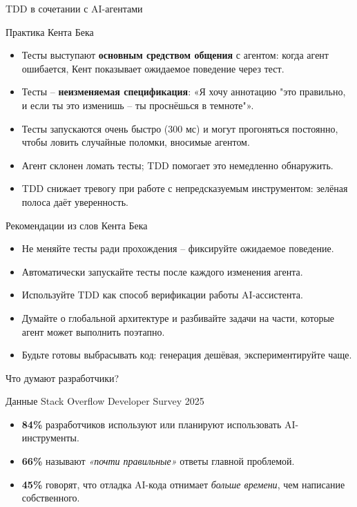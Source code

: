 \documentclass[14pt,aspectratio=169]{beamer}
\begin{document}
\begin{frame}{TDD в сочетании с AI-агентами}
    \begin{block}{Практика Кента Бека}
        \begin{itemize}
            \item Тесты выступают \textbf{основным средством общения} с агентом: когда агент ошибается, Кент показывает ожидаемое поведение через тест.
            \item Тесты -- \textbf{неизменяемая спецификация}: «Я хочу аннотацию "это правильно, и если ты это изменишь -- ты проснёшься в темноте"».
            \item Тесты запускаются очень быстро (300 мс) и могут прогоняться постоянно, чтобы ловить случайные поломки, вносимые агентом.
            \item Агент склонен ломать тесты; TDD помогает это немедленно обнаружить.
            \item TDD снижает тревогу при работе с непредсказуемым инструментом: зелёная полоса даёт уверенность.
        \end{itemize}
    \end{block}
\end{frame}

\begin{frame}{Рекомендации из слов Кента Бека}
    \begin{itemize}
        \item Не меняйте тесты ради прохождения -- фиксируйте ожидаемое поведение.
        \item Автоматически запускайте тесты после каждого изменения агента.
        \item Используйте TDD как способ верификации работы AI-ассистента.
        \item Думайте о глобальной архитектуре и разбивайте задачи на части, которые агент может выполнить поэтапно.
        \item Будьте готовы выбрасывать код: генерация дешёвая, экспериментируйте чаще.
    \end{itemize}
\end{frame}

\begin{frame}{Что думают разработчики?}
    \begin{block}{Данные Stack Overflow Developer Survey 2025}
        \begin{itemize}
            \item \textbf{84\%} разработчиков используют или планируют использовать AI-инструменты.
            \item \textbf{66\%} называют \textit{«почти правильные»} ответы главной проблемой.
            \item \textbf{45\%} говорят, что отладка AI-кода отнимает \textit{больше времени}, чем написание собственного.
        \end{itemize}
    \end{block}
    \vspace{0.3cm}
\end{frame}
\end{document}
